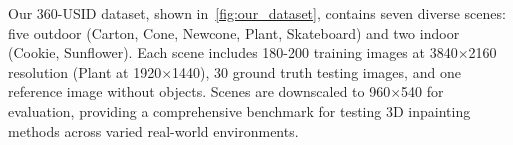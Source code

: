 \vspace{3pt}
Our 360-USID dataset, shown in~\cref{fig:our_dataset}, contains seven diverse scenes: five outdoor (Carton, Cone, Newcone, Plant, Skateboard) and two indoor (Cookie, Sunflower). Each scene includes 180-200 training images at 3840$\times$2160 resolution (Plant at 1920$\times$1440), 30 ground truth testing images, and one reference image without objects. Scenes are downscaled to 960$\times$540 for evaluation, providing a comprehensive benchmark for testing 3D inpainting methods across varied real-world environments.





